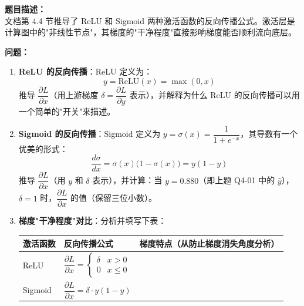 \documentclass[a4paper,11pt]{ctexart}
\begin{document}
\begin{problembox}
    \textbf{题目描述：}\\
    文档第 4.4 节推导了 ReLU 和 Sigmoid 两种激活函数的反向传播公式。激活层是计算图中的"非线性节点"，其梯度的"干净程度"直接影响梯度能否顺利流向底层。

    \vspace{0.3cm}
    \textbf{问题：}
    \begin{enumerate}[(1)]
        \item \textbf{ReLU 的反向传播}：ReLU 定义为：
        \[
        y = \text{ReLU}(x) = \max(0, x)
        \]
        推导 $\dfrac{\partial L}{\partial x}$（用上游梯度 $\delta = \dfrac{\partial L}{\partial y}$ 表示），并解释为什么 ReLU 的反向传播可以用一个简单的"开关"来描述。

        \item \textbf{Sigmoid 的反向传播}：Sigmoid 定义为 $y = \sigma(x) = \dfrac{1}{1+e^{-x}}$，其导数有一个优美的形式：
        \[
        \frac{d\sigma}{dx} = \sigma(x)\bigl(1-\sigma(x)\bigr) = y(1-y)
        \]
        推导 $\dfrac{\partial L}{\partial x}$（用 $y$ 和 $\delta$ 表示），并计算：当 $y=0.880$（即上题 Q4-01 中的 $\hat{y}$），$\delta = 1$ 时，$\dfrac{\partial L}{\partial x}$ 的值（保留三位小数）。

        \item \textbf{梯度"干净程度"对比}：分析并填写下表：

        \begin{center}
        \begin{tabular}{p{2.0cm} p{4.0cm} p{4.5cm}}
            \toprule
            激活函数 & 反向传播公式 & 梯度特点（从防止梯度消失角度分析）\\
            \midrule
            ReLU & $\dfrac{\partial L}{\partial x} = \begin{cases} \delta & x > 0 \\ 0 & x \leq 0 \end{cases}$ & \underline{\hspace{4cm}} \\[2.5em]
            Sigmoid & $\dfrac{\partial L}{\partial x} = \delta \cdot y(1-y)$ & \underline{\hspace{4cm}} \\
            \bottomrule
        \end{tabular}
        \end{center}


\end{enumerate}
\end{problembox}
\end{document}
